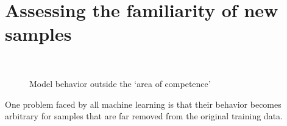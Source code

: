 \section{Assessing the familiarity of new samples}
\label{sec_familiarity}
%
\begin{figure}
\caption{Model behavior outside the `area of competence'}
\label{fig_area_of_competence}
%
\begin{center}
\\
\end{center}
\end{figure}
%
One problem faced by all machine learning is that their behavior becomes arbitrary for samples that are far removed from the original training data.
